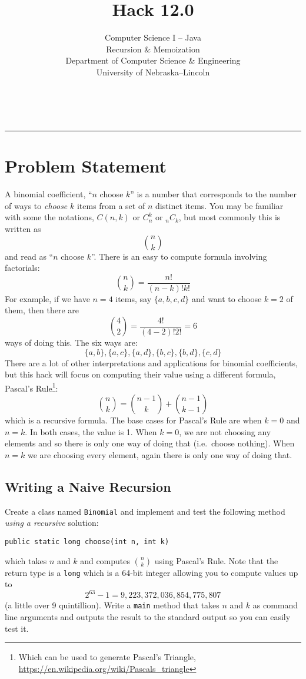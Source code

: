\documentclass[12pt]{scrartcl}
\title{Hack 12.0}\let\Title\@title
\subtitle{Computer Science I -- Java\\
Recursion \& Memoization\\
{\small
\vskip1cm
Department of Computer Science \& Engineering \\
University of Nebraska--Lincoln}
\vskip-3cm}
\date{~}
\begin{document}
\maketitle

\hrule



\section*{Problem Statement}

A binomial coefficient, ``$n$ choose $k$'' is a number that corresponds 
to the number of ways to \emph{choose} $k$ items from a set of $n$ distinct
items.  You may be familiar with some the notations, $C(n,k)$ or $C_n^k$ 
or ${}_{n}C_k $, but most commonly this is written as 
  $${n \choose k}$$
and read as ``$n$ choose $k$''.  There is an easy to compute formula involving
factorials:
  $${n \choose k} = \frac{n!}{(n-k)!k!}$$
For example, if we have $n = 4$ items, say $\{a, b, c, d\}$ and want to choose
$k=2$ of them, then there are 
  $${4 \choose 2} = \frac{4!}{(4-2)!2!} = 6$$
ways of doing this.  The six ways are:
  $$\{a, b\}, \{a, c\}, \{a, d\}, \{b, c\}, \{b, d\}, \{c, d\}$$
There are a lot of other interpretations and applications for binomial 
coefficients, but this hack will focus on computing their value using
a different formula, Pascal's Rule\footnote{Which can be used to generate
Pascal's Triangle, \url{https://en.wikipedia.org/wiki/Pascals_triangle}}:
  $${n \choose k} = {n-1 \choose k} + {n-1 \choose k-1}$$
which is a recursive formula.  The base cases for Pascal's Rule are when
$k = 0$ and $n = k$.  In both cases, the value is 1.  When $k = 0$, we are
not choosing any elements and so there is only one way of doing that (i.e.\
choose nothing).  When $n = k$ we are choosing every element, again there
is only one way of doing that.  

\subsection*{Writing a Naive Recursion}

Create a class named \texttt{Binomial} and implement and 
test the following method \emph{using a recursive} solution:

\texttt{public static long choose(int n, int k)}

which takes $n$ and $k$ and computes ${n\choose k}$ using Pascal's Rule.
Note that the return type is a \texttt{long} which is a 64-bit
integer allowing you to compute values up to 
  $$2^{63}-1 = 9,223,372,036,854,775,807$$
(a little over 9 quintillion).  Write a \texttt{main} method
that takes $n$ and $k$ as command line arguments and outputs the result
to the standard output so you can easily test it.
\end{document}
